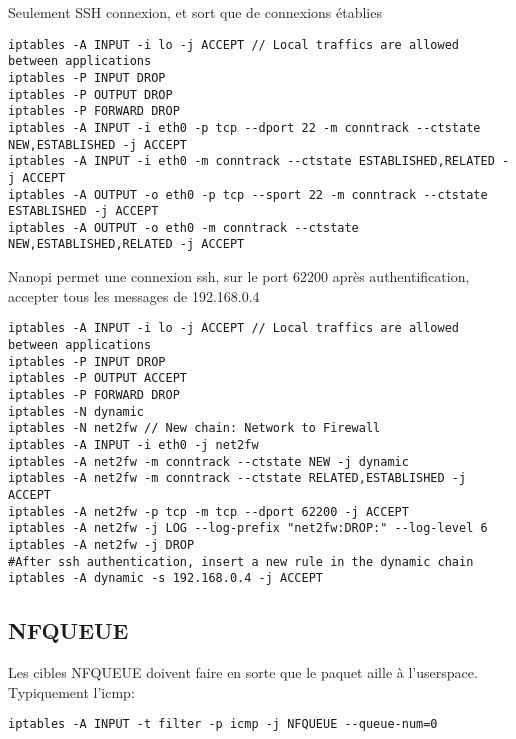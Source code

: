 Seulement SSH connexion, et sort que de connexions établies
\begin{Verbatim}[breaklines=true, breakanywhere=true]
iptables -A INPUT -i lo -j ACCEPT // Local traffics are allowed between applications
iptables -P INPUT DROP
iptables -P OUTPUT DROP
iptables -P FORWARD DROP
iptables -A INPUT -i eth0 -p tcp --dport 22 -m conntrack --ctstate NEW,ESTABLISHED -j ACCEPT
iptables -A INPUT -i eth0 -m conntrack --ctstate ESTABLISHED,RELATED -j ACCEPT
iptables -A OUTPUT -o eth0 -p tcp --sport 22 -m conntrack --ctstate ESTABLISHED -j ACCEPT
iptables -A OUTPUT -o eth0 -m conntrack --ctstate NEW,ESTABLISHED,RELATED -j ACCEPT
\end{Verbatim}
Nanopi permet une connexion ssh, sur le port 62200 après authentification, accepter tous les messages de 192.168.0.4
\begin{Verbatim}[breaklines=true, breakanywhere=true]
iptables -A INPUT -i lo -j ACCEPT // Local traffics are allowed between applications
iptables -P INPUT DROP
iptables -P OUTPUT ACCEPT
iptables -P FORWARD DROP
iptables -N dynamic
iptables -N net2fw // New chain: Network to Firewall
iptables -A INPUT -i eth0 -j net2fw
iptables -A net2fw -m conntrack --ctstate NEW -j dynamic
iptables -A net2fw -m conntrack --ctstate RELATED,ESTABLISHED -j ACCEPT
iptables -A net2fw -p tcp -m tcp --dport 62200 -j ACCEPT
iptables -A net2fw -j LOG --log-prefix "net2fw:DROP:" --log-level 6
iptables -A net2fw -j DROP
#After ssh authentication, insert a new rule in the dynamic chain
iptables -A dynamic -s 192.168.0.4 -j ACCEPT
\end{Verbatim}

\subsection{NFQUEUE}
Les cibles NFQUEUE doivent faire en sorte que le paquet aille à l'userspace. Typiquement l'icmp:
\begin{Verbatim}[breaklines=true, breakanywhere=true]
iptables -A INPUT -t filter -p icmp -j NFQUEUE --queue-num=0
\end{Verbatim}




